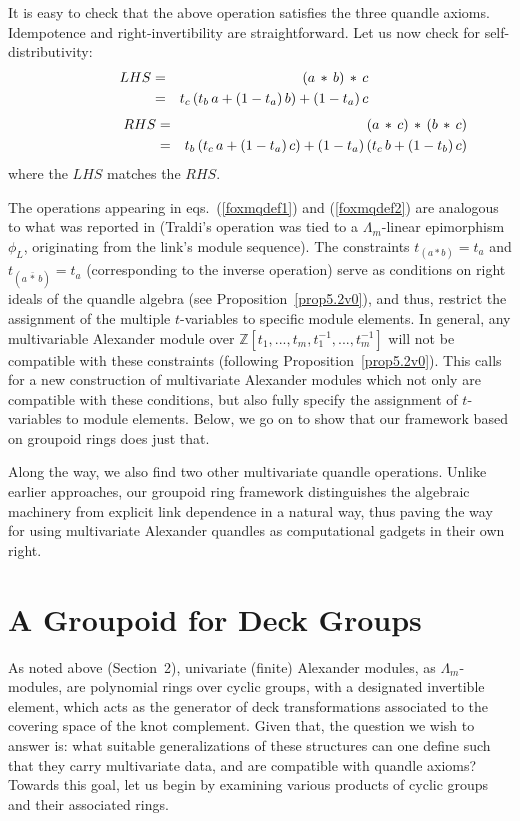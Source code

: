 \documentclass[a4paper,12pt]{article}
\newcommand{\Z}{\mathbb{Z}}
\newcommand{\Lam}{\Lambda}
\newcommand{\Lm}{\Lambda_m}
\begin{document}
It is easy to check that the above operation satisfies the three quandle axioms. 
Idempotence and right-invertibility are straightforward. Let us now check for self-distributivity: 
\begin{eqnarray*}  
\hspace{-5cm}  LHS &=& (a \,*\, b) \,*\, c   \\
 &=&  t_c \, ( t_b\,a + (1 - t_a)\,b  )  + (1 - t_a) \, c
\end{eqnarray*} 
\begin{eqnarray*}    
\hspace{1.8cm}   RHS &=& (a \,*\, c) \,*\,  (b \,*\, c)  \\
 &=&  t_b \, ( t_c\,a + (1 - t_a)\,c  )  + (1 - t_a) \, ( t_c\,b + (1 - t_b)\,c  ) 
\end{eqnarray*} 
where the $LHS$ matches the $RHS$. 

The operations appearing in eqs.~(\ref{foxmqdef1}) and (\ref{foxmqdef2}) are  analogous to what was reported in \cite{traldi1}  (Traldi's operation was tied to a  $\Lam_m$-linear epimorphism $\phi_L$, originating from the link's module sequence).  The constraints  $t_{(a * b)} = t_a$ and $t_{(a \,\bar{*}\, b)} = t_a$   (corresponding to the inverse operation)  serve as conditions on right ideals of the quandle algebra (see Proposition~\ref{prop5.2v0}), and thus, restrict the assignment of the multiple $t$-variables to specific module elements. In general, any multivariable Alexander module over  $\Z[t_1, ..., t_m, t_1^{-1}, ..., t_m^{-1}]$ will not be compatible with these constraints (following   Proposition~\ref{prop5.2v0}).  This calls for a new construction of multivariate Alexander modules which not only are compatible with these conditions, but also fully specify the assignment of $t$-variables to module elements. Below, we go on to show that our framework based on groupoid rings does just that.  

Along the way, we also find two other multivariate quandle operations. Unlike earlier approaches, our groupoid ring framework distinguishes the algebraic machinery from explicit link dependence in a natural way, thus paving the way for using multivariate Alexander quandles as computational gadgets in their own right.   
 

\section{A Groupoid for Deck Groups }

As noted above (Section~2),  univariate (finite) Alexander modules, as $\Lm$-modules, are polynomial rings over cyclic groups, with a designated invertible element, which acts as the generator of deck transformations associated to the covering space of the knot complement. Given that, the question we wish to answer is: what suitable generalizations of these structures can one define such that they carry multivariate data, and are compatible with quandle axioms? Towards this goal, let us begin by examining various products of cyclic groups and their associated rings. 
\end{document}
